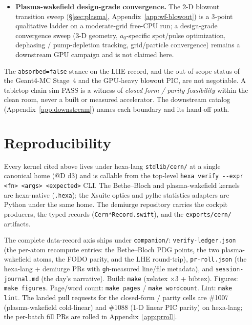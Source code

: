 \documentclass[11pt,a4paper]{article}
\begin{document}
\begin{itemize}
  (\S\ref{sec:future} path~1); per
  \texttt{feedback-closure-is-physical-limit}, the residual is reported
  as measured (30\,\% mean closure, 91--98\,\% mid-plateau closure) with
  the residual class named, never as ``stopping power solved''.
\item \textbf{Plasma-wakefield design-grade convergence.} The 2-D
  blowout transition sweep (\S\ref{sec:plasma},
  Appendix~\ref{app:wf-blowout}) is a 3-point qualitative ladder on a
  moderate-grid free-CPU run; a design-grade convergence sweep (3-D
  geometry, $a_0$-specific spot/pulse optimization, dephasing /
  pump-depletion tracking, grid/particle convergence) remains a
  downstream GPU campaign and is not claimed here.
\end{itemize}

\noindent
The \texttt{absorbed=false} stance on the LHE record, and the
out-of-scope status of the Geant4-MC Stage~4 and the GPU-heavy blowout
PIC, are not negotiable. A tabletop-chain sim-PASS is a witness of
\emph{closed-form / parity feasibility} within the clean room, never a
built or measured accelerator. The downstream catalog
(Appendix~\ref{app:downstream}) names each boundary and its hand-off
path.

\section{Reproducibility}
\label{sec:repro}

Every kernel cited above lives under hexa-lang \verb|stdlib/cern/| at a
single canonical home (@D d3) and is callable from the top-level
\verb|hexa verify --expr <fn> <args> <expected>| CLI. The Bethe--Bloch
and plasma-wakefield kernels are hexa-native (\verb|.hexa|); the Xsuite
optics and pylhe statistics adapters are Python under the same home. The
demiurge repository carries the cockpit producers, the typed records
(\texttt{Cern*Record.swift}), and the \verb|exports/cern/| artifacts.

\smallskip\noindent
The complete data-record axis ships under \texttt{companion/}:
\texttt{verify-ledger.json} (the per-atom recompute entries: the
Bethe--Bloch PDG points, the two plasma-wakefield atoms, the FODO
parity, and the LHE round-trip),
\texttt{pr-roll.json} (the hexa-lang + demiurge PRs with
\texttt{gh}-measured line/file metadata), and
\texttt{session-journal.md} (the day's narrative). Build:
\texttt{make} (xelatex $\times 3$ + bibtex). Figures:
\texttt{make figures}. Page/word count: \texttt{make pages} /
\texttt{make wordcount}. Lint: \texttt{make lint}.
The landed pull requests for the closed-form / parity cells are
\#1007 (plasma-wakefield cold-linear) and \#1088 (1-D linear PIC
parity) on hexa-lang; the per-batch fill PRs are rolled in
Appendix~\ref{app:prroll}.
\end{document}
